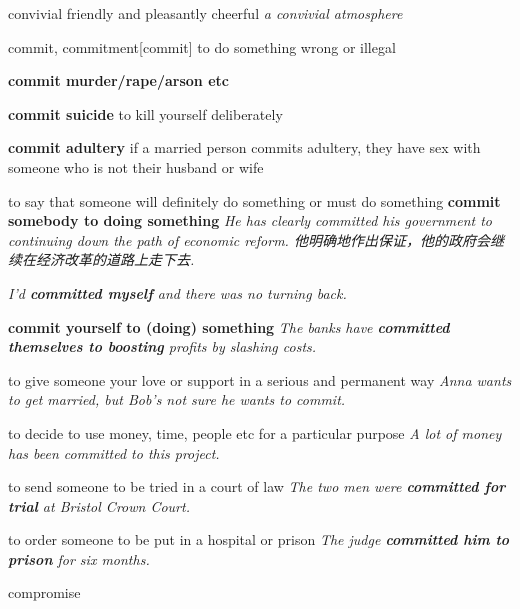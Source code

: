 \begin{DefWord}{convivial}
    friendly and pleasantly cheerful
    \textit{a convivial atmosphere}
\end{DefWord}

\begin{DefWord}{commit, commitment}[commit]
    to do something wrong or illegal

    \textbf{commit murder/rape/arson etc}

    \textbf{commit suicide} to kill yourself deliberately

    \textbf{commit adultery} if a married person commits adultery, they have sex with someone who is not their husband or wife

    to say that someone will definitely do something or must do something
    \textbf{commit somebody to doing something}
    \textit{He has clearly committed his government to continuing down the path of economic reform. 他明确地作出保证，他的政府会继续在经济改革的道路上走下去. }

    \textit{I'd \textbf{committed myself} and there was no turning back.}

    \textbf{commit yourself to (doing) something} 
    \textit{The banks have \textbf{committed themselves to boosting} profits by slashing costs.}

    to give someone your love or support in a serious and permanent way
    \textit{Anna wants to get married, but Bob's not sure he wants to commit.}

    to decide to use money, time, people etc for a particular purpose
    \textit{A lot of money has been committed to this project.}

    to send someone to be tried in a court of law
    \textit{The two men were \textbf{committed for trial} at Bristol Crown Court.}

    to order someone to be put in a hospital or prison
    \textit{The judge \textbf{committed him to prison} for six months.}
\end{DefWord}

\begin{DefWord}{compromise}
\end{DefWord}

